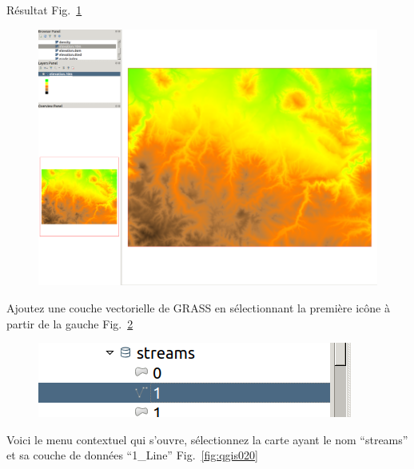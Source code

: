 R\'esultat Fig.~\ref{fig:qgis018}

\begin{figure}[htbp]
   \centering
   \includegraphics[scale=0.11]{qgis018.png}
   \caption{}
   \label{fig:qgis018}
\end{figure}

Ajoutez une couche vectorielle de GRASS en s\'electionnant la premi\`ere ic\^one \`a partir de la gauche Fig.~\ref{fig:qgis019}

\begin{figure}[htbp]
   \centering
   \includegraphics[scale=0.35]{qgis019.png}
   \caption{}
   \label{fig:qgis019}
\end{figure}

Voici le menu contextuel qui s'ouvre, s\'electionnez la carte ayant le nom ``streams'' et sa couche de donn\'ees ``1\_Line'' Fig.~\ref{fig:qgis020}

